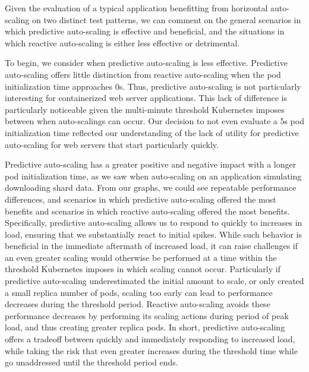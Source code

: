 Given the evaluation of a typical application benefitting from horizontal
auto-scaling on two distinct test patterns, we can comment on the general
scenarios in which predictive auto-scaling is effective and beneficial, and the
situations in which reactive auto-scaling is either less effective or
detrimental.

To begin, we consider when predictive auto-scaling is less
effective. Predictive auto-scaling offers little distinction from reactive
auto-scaling when the pod initialization time approaches 0s. Thus, predictive
auto-scaling is not particularly interesting for containerized web server
applications. This lack of difference is particularly noticeable given the
multi-minute threshold Kubernetes imposes between when auto-scalings can occur.
Our decision to not even evaluate a 5s pod initialization time reflected our
understanding of the lack of utility for predictive auto-scaling for web servers
that start particularly quickly.

Predictive auto-scaling has a greater positive and negative impact
with a longer pod initialization time, as we saw when auto-scaling on an
application simulating downloading shard data. From our graphs, we could see
repeatable performance differences, and scenarios in which predictive
auto-scaling offered the most benefits and scenarios in which reactive
auto-scaling offered the most benefits. Specifically, predictive auto-scaling
allows us to respond to quickly to increases in load, ensuring that we
substantially react to initial spikes. While such behavior is beneficial in the
immediate aftermath of increased load, it can raise challenges if an even
greater scaling would otherwise be performed at a time within the
threshold Kubernetes imposes in
which scaling cannot occur. Particularly if predictive auto-scaling
underestimated the initial amount to scale, or only created a small replica
number of pods, scaling too early can lead to
performance decreases during the threshold period. Reactive auto-scaling avoids
these performance decreases by performing its scaling actions during period of
peak load, and thus creating greater replica pods. In short, predictive
auto-scaling offers a tradeoff between quickly and immediately responding to
increased load, while taking the risk that even greater increases during the
threshold time while go unaddressed until the threshold period ends.
